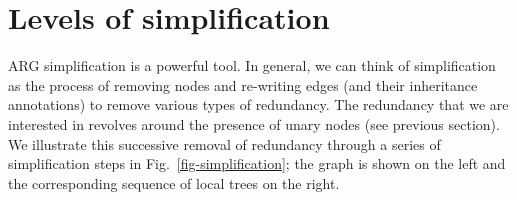 \documentclass{article}
\begin{document}


\section{Levels of simplification}
\label{sec-ARG-simplification}
ARG simplification is a powerful tool.
In general, we can think of
simplification as the process
of removing nodes and re-writing edges (and their inheritance annotations)
to remove various types of redundancy.
The redundancy that we are interested in
revolves around the presence of unary nodes (see previous section).
We illustrate this successive removal of redundancy
through a series of simplification steps
in Fig.~\ref{fig-simplification};
the graph is shown on the left and the corresponding sequence
of local trees on the right.
\end{document}
